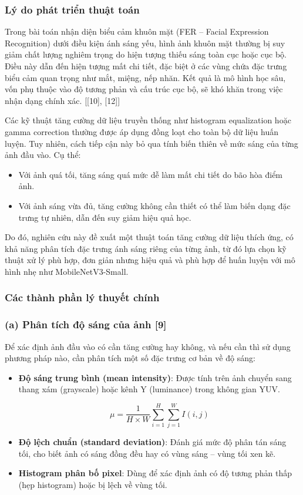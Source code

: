 \subsubsection{Lý do phát triển thuật toán} %
Trong bài toán nhận diện biểu cảm khuôn mặt (FER -- Facial Expression Recognition) dưới điều kiện ánh sáng yếu, hình ảnh khuôn mặt thường bị suy giảm chất lượng nghiêm trọng do hiện tượng thiếu sáng toàn cục hoặc cục bộ. Điều này dẫn đến hiện tượng mất chi tiết, đặc biệt ở các vùng chứa đặc trưng biểu cảm quan trọng như mắt, miệng, nếp nhăn. Kết quả là mô hình học sâu, vốn phụ thuộc vào độ tương phản và cấu trúc cục bộ, sẽ khó khăn trong việc nhận dạng chính xác. [[10], [12]]

Các kỹ thuật tăng cường dữ liệu truyền thống như histogram equalization hoặc gamma correction thường được áp dụng đồng loạt cho toàn bộ dữ liệu huấn luyện. Tuy nhiên, cách tiếp cận này bỏ qua tính biến thiên về mức sáng của từng ảnh đầu vào. Cụ thể:
\begin{itemize}[]
    \item Với ảnh quá tối, tăng sáng quá mức dễ làm mất chi tiết do bão hòa điểm ảnh.
    \item Với ảnh sáng vừa đủ, tăng cường không cần thiết có thể làm biến dạng đặc trưng tự nhiên, dẫn đến suy giảm hiệu quả học.
\end{itemize}

Do đó, nghiên cứu này đề xuất một thuật toán tăng cường dữ liệu thích ứng, có khả năng phân tích đặc trưng ánh sáng riêng của từng ảnh, từ đó lựa chọn kỹ thuật xử lý phù hợp, đơn giản nhưng hiệu quả và phù hợp để huấn luyện với mô hình nhẹ như MobileNetV3-Small.

\subsubsection{Các thành phần lý thuyết chính} %
\subsubsection*{(a) Phân tích độ sáng của ảnh [9]}

Để xác định ảnh đầu vào có cần tăng cường hay không, và nếu cần thì sử dụng phương pháp nào, cần phân tích một số đặc trưng cơ bản về độ sáng:


\begin{itemize}[]
    \item \textbf{Độ sáng trung bình (mean intensity)}: Được tính trên ảnh chuyển sang thang xám (grayscale) hoặc kênh Y (luminance) trong không gian YUV.
    
    \[ \mu = \frac{1}{H \times W} \sum_{i=1}^{H} \sum_{j=1}^{W} I(i,j) \]
    
    \item \textbf{Độ lệch chuẩn (standard deviation)}: Đánh giá mức độ phân tán sáng tối, cho biết ảnh có sáng đồng đều hay có vùng sáng -- vùng tối xen kẽ.
    \item \textbf{Histogram phân bố pixel}: Dùng để xác định ảnh có độ tương phản thấp (hẹp histogram) hoặc bị lệch về vùng tối.
\end{itemize}

